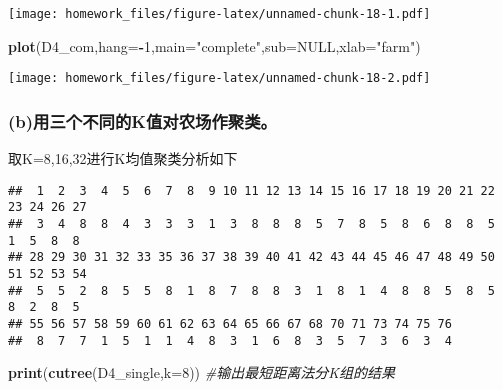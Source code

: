 \documentclass[
]{article}
\newenvironment{Shaded}{\begin{snugshade}}{\end{snugshade}}
\newcommand{\CommentTok}[1]{\textcolor[rgb]{0.56,0.35,0.01}{\textit{#1}}}
\newcommand{\DataTypeTok}[1]{\textcolor[rgb]{0.13,0.29,0.53}{#1}}
\newcommand{\DecValTok}[1]{\textcolor[rgb]{0.00,0.00,0.81}{#1}}
\newcommand{\KeywordTok}[1]{\textcolor[rgb]{0.13,0.29,0.53}{\textbf{#1}}}
\newcommand{\NormalTok}[1]{#1}
\newcommand{\OperatorTok}[1]{\textcolor[rgb]{0.81,0.36,0.00}{\textbf{#1}}}
\newcommand{\OtherTok}[1]{\textcolor[rgb]{0.56,0.35,0.01}{#1}}
\newcommand{\StringTok}[1]{\textcolor[rgb]{0.31,0.60,0.02}{#1}}
\begin{document}
\texttt{[image: homework\_files/figure-latex/unnamed-chunk-18-1.pdf]}

\begin{Shaded}
\begin{Highlighting}[]
\KeywordTok{plot}\NormalTok{(D4_com,}\DataTypeTok{hang=}\OperatorTok{-}\DecValTok{1}\NormalTok{,}\DataTypeTok{main=}\StringTok{"complete"}\NormalTok{,}\DataTypeTok{sub=}\OtherTok{NULL}\NormalTok{,}\DataTypeTok{xlab=}\StringTok{"farm"}\NormalTok{)}
\end{Highlighting}
\end{Shaded}

\texttt{[image: homework\_files/figure-latex/unnamed-chunk-18-2.pdf]}

\hypertarget{bux7528ux4e09ux4e2aux4e0dux540cux7684kux503cux5bf9ux519cux573aux4f5cux805aux7c7b}{%
\subsubsection{(b)用三个不同的K值对农场作聚类。}\label{bux7528ux4e09ux4e2aux4e0dux540cux7684kux503cux5bf9ux519cux573aux4f5cux805aux7c7b}}

取K=8,16,32进行K均值聚类分析如下

\begin{Shaded}
\end{Shaded}

\begin{verbatim}
##  1  2  3  4  5  6  7  8  9 10 11 12 13 14 15 16 17 18 19 20 21 22 23 24 26 27 
##  3  4  8  8  4  3  3  3  1  3  8  8  8  5  7  8  5  8  6  8  8  5  1  5  8  8 
## 28 29 30 31 32 33 35 36 37 38 39 40 41 42 43 44 45 46 47 48 49 50 51 52 53 54 
##  5  5  2  8  5  5  8  1  8  7  8  8  3  1  8  1  4  8  8  5  8  5  8  2  8  5 
## 55 56 57 58 59 60 61 62 63 64 65 66 67 68 70 71 73 74 75 76 
##  8  7  7  1  5  1  1  4  8  3  1  6  8  3  5  7  3  6  3  4
\end{verbatim}

\begin{Shaded}
\begin{Highlighting}[]
\KeywordTok{print}\NormalTok{(}\KeywordTok{cutree}\NormalTok{(D4_single,}\DataTypeTok{k=}\DecValTok{8}\NormalTok{))  }\CommentTok{#输出最短距离法分K组的结果}
\end{Highlighting}
\end{Shaded}
\end{document}

